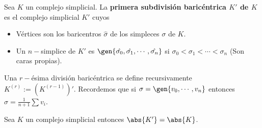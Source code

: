 \documentclass{article}
\begin{document}
\vspace{2mm}
\begin{dfn}
    Sea $K$ un complejo simplicial. La \textbf{primera subdivisión baricéntrica $K'$ de $K$} es el 
    complejo simplicial $K'$ cuyos
    \begin{itemize}
        \item Vértices son los baricentros $\hat{\sigma}$ de los simpleces $\sigma$ de $K$.
        \item Un $n-$simplice de $K'$ es 
        $\gen{\hat{\sigma_{0}},\hat{\sigma_{1}},\cdots,\hat{\sigma_{n}}}$ si 
        $\sigma_{0}<\sigma_{1}<\cdots<\sigma_{n}$ (Son caras propias).
    \end{itemize}
    Una $r-$ésima división baricéntrica se define recursivamente $K^{(r)}:=(K^{(r-1)})'$.
    Recordemos que si $\sigma=\gen{v_{0},\cdots,v_{n}}$ entonces 
    $\hat{\sigma}=\frac{1}{n+1}\sum v_{i}$.
\end{dfn}

\vspace{2mm}
\begin{prop}
    Sea $K$ un complejo simplicial entonces $\abs{K'}=\abs{K}$.
\end{prop}
\end{document}
